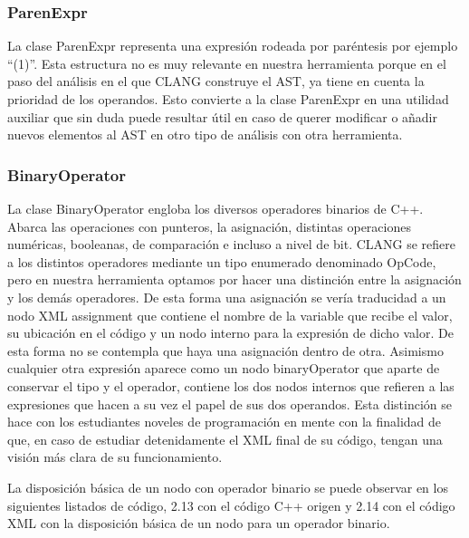 \subsubsection*{ParenExpr}

La clase ParenExpr representa una expresi\'on rodeada por par\'entesis por ejemplo ``(1)''. Esta estructura no es muy relevante en nuestra herramienta porque en el paso del an\'alisis en el que CLANG construye el AST, ya tiene en cuenta la prioridad de los operandos. Esto convierte a la clase ParenExpr en una utilidad auxiliar que sin duda puede resultar \'util en caso de querer modificar o a\~nadir nuevos elementos al AST en otro tipo de an\'alisis con otra herramienta.

\subsubsection*{BinaryOperator}

La clase BinaryOperator engloba los diversos operadores binarios de C++. Abarca las operaciones con punteros, la asignaci\'on, distintas operaciones num\'ericas, booleanas, de comparaci\'on e incluso a nivel de bit. CLANG se refiere a los distintos operadores mediante un tipo enumerado denominado OpCode, pero en nuestra herramienta optamos por hacer una distinci\'on entre la asignaci\'on y los dem\'as operadores. De esta forma una asignaci\'on se ver\'ia traducidad a un nodo XML assignment que contiene el nombre de la variable que recibe el valor, su ubicaci\'on en el c\'odigo y un nodo interno para la expresi\'on de dicho valor. De esta forma no se contempla que haya una asignaci\'on dentro de otra. Asimismo cualquier otra expresi\'on aparece como un nodo binaryOperator que aparte de conservar el tipo y el operador, contiene los dos nodos internos que refieren a las expresiones que hacen a su vez el papel de sus dos operandos. Esta distinci\'on se hace con los estudiantes noveles de programaci\'on en mente con la finalidad de que, en caso de estudiar detenidamente el XML final de su c\'odigo, tengan una visi\'on m\'as clara de su funcionamiento.

La disposici\'on b\'asica de un nodo con operador binario se puede observar en los siguientes listados de c\'odigo, 2.13 con el c\'odigo C++ origen y 2.14 con el c\'odigo XML con la disposici\'on b\'asica de un nodo para un operador binario.

